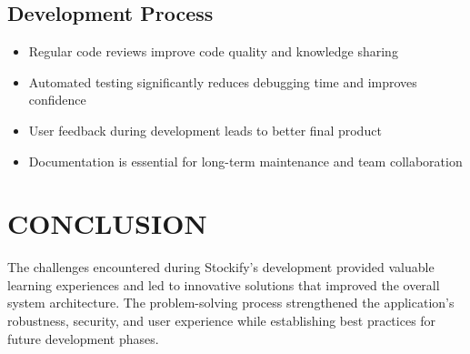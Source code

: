 \subsection{Development Process}

\begin{itemize}
\item Regular code reviews improve code quality and knowledge sharing
\item Automated testing significantly reduces debugging time and improves confidence
\item User feedback during development leads to better final product
\item Documentation is essential for long-term maintenance and team collaboration
\end{itemize}

\section{CONCLUSION}

The challenges encountered during Stockify's development provided valuable learning experiences and led to innovative solutions that improved the overall system architecture. The problem-solving process strengthened the application's robustness, security, and user experience while establishing best practices for future development phases.